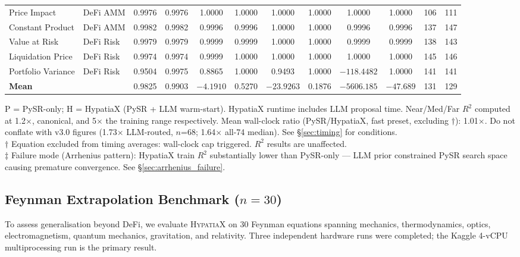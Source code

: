 \documentclass[twoside,11pt]{article}
\begin{document}
\begin{table}[htbp]
{\begin{tabular}{llcccccccccc}
Price Impact         & DeFi AMM  & 0.9976 & 0.9976 & 1.0000 & 1.0000 & 1.0000 & 1.0000 & 1.0000 & 1.0000 & 106 & 111 \\
Constant Product     & DeFi AMM  & 0.9982 & 0.9982 & 0.9996 & 0.9996 & 1.0000 & 1.0000 & 0.9996 & 0.9996 & 137 & 147 \\
Value at Risk        & DeFi Risk & 0.9979 & 0.9979 & 0.9999 & 0.9999 & 1.0000 & 1.0000 & 0.9999 & 0.9999 & 138 & 143 \\
Liquidation Price    & DeFi Risk & 0.9974 & 0.9974 & 0.9999 & 1.0000 & 1.0000 & 1.0000 & 1.0000 & 1.0000 & 145 & 146 \\
Portfolio Variance   & DeFi Risk & 0.9504 & 0.9975 & 0.8865 & 1.0000 & 0.9493 & 1.0000 & $-118.4482$ & 1.0000 & 141 & 141 \\
\midrule
\textbf{Mean} & & 0.9825 & 0.9903 & $-4.1910$ & 0.5270 & $-23.9263$ & 0.1876 & $-5606.185$ & $-47.689$ & 131 & 129 \\
\bottomrule
\end{tabular}%
}%
\par\vspace{4pt}
{\footnotesize\noindent
P = PySR-only; H = HypatiaX (PySR + LLM warm-start). HypatiaX runtime includes LLM proposal time. Near/Med/Far $R^2$ computed at 1.2$\times$, canonical, and 5$\times$ the training range respectively. Mean wall-clock ratio (PySR/HypatiaX, fast preset, excluding $\dagger$): 1.01$\times$. Do not conflate with v3.0 figures (1.73$\times$ LLM-routed, $n$=68; 1.64$\times$ all-74 median). See \S\ref{sec:timing} for conditions.\\[2pt]
$\dagger$ Equation excluded from timing averages: wall-clock cap triggered. $R^2$ results are unaffected.\\[2pt]
$\ddagger$ Failure mode (Arrhenius pattern): HypatiaX train $R^2$ substantially lower than PySR-only --- LLM prior constrained PySR search space causing premature convergence. See \S\ref{sec:arrhenius_failure}.
}
\end{table}

\subsection{Feynman Extrapolation Benchmark ($n=30$)}
\label{sec:feynman30}

To assess generalisation beyond DeFi, we evaluate \textsc{HypatiaX} on 30
Feynman equations spanning mechanics, thermodynamics, optics, electromagnetism,
quantum mechanics, gravitation, and relativity.  Three independent hardware runs
were completed; the Kaggle 4-vCPU multiprocessing run is the primary result.
\end{document}
